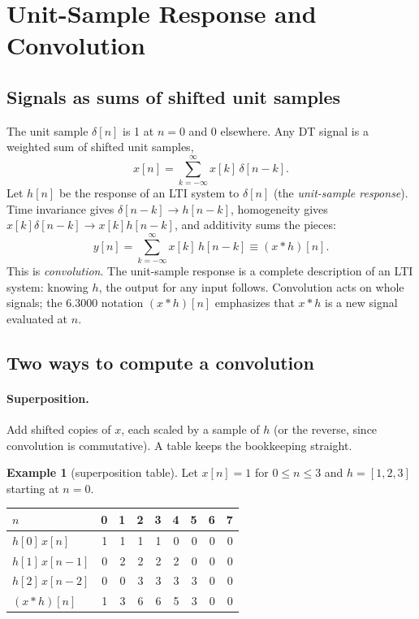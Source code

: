 \documentclass[11pt]{article}
\numberwithin{equation}{section}
\theoremstyle{definition}
\newtheorem{example}{Example}[section]
\theoremstyle{remark}
\begin{document}
\section{Unit-Sample Response and Convolution}

\subsection{Signals as sums of shifted unit samples}
The unit sample $\delta[n]$ is 1 at $n=0$ and 0 elsewhere. Any DT signal is a weighted sum of
shifted unit samples,
\begin{equation}
x[n]=\sum_{k=-\infty}^{\infty}x[k]\,\delta[n-k].
\end{equation}
Let $h[n]$ be the response of an LTI system to $\delta[n]$ (the \emph{unit-sample response}).
Time invariance gives $\delta[n-k]\to h[n-k]$, homogeneity gives $x[k]\delta[n-k]\to x[k]h[n-k]$,
and additivity sums the pieces:
\begin{equation}
\boxed{\;y[n]=\sum_{k=-\infty}^{\infty}x[k]\,h[n-k]\equiv(x*h)[n].\;}
\label{eq:conv}
\end{equation}
This is \emph{convolution}. The unit-sample response is a complete description of an LTI
system: knowing $h$, the output for any input follows. Convolution acts on whole signals; the
6.3000 notation $(x*h)[n]$ emphasizes that $x*h$ is a new signal evaluated at $n$.

\subsection{Two ways to compute a convolution}
\paragraph{Superposition.} Add shifted copies of $x$, each scaled by a sample of $h$ (or the
reverse, since convolution is commutative). A table keeps the bookkeeping straight.

\begin{example}[superposition table]
Let $x[n]=1$ for $0\le n\le3$ and $h=[1,2,3]$ starting at $n=0$.
\begin{center}
\begin{tabular}{@{}l*{8}{r}@{}}
\toprule
$n$ & 0 & 1 & 2 & 3 & 4 & 5 & 6 & 7\\
\midrule
$h[0]\,x[n]$ & 1 & 1 & 1 & 1 & 0 & 0 & 0 & 0\\
$h[1]\,x[n-1]$ & 0 & 2 & 2 & 2 & 2 & 0 & 0 & 0\\
$h[2]\,x[n-2]$ & 0 & 0 & 3 & 3 & 3 & 3 & 0 & 0\\
\midrule
$(x*h)[n]$ & 1 & 3 & 6 & 6 & 5 & 3 & 0 & 0\\
\bottomrule
\end{tabular}
\end{center}
\end{example}
\end{document}
